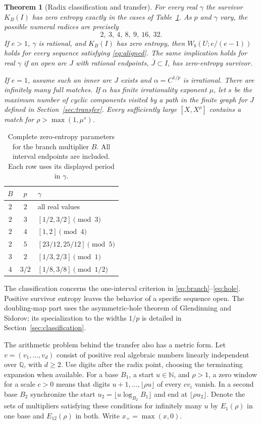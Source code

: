\documentclass[11pt,reqno,a4paper]{amsart}
\newtheorem{theorem}{Theorem}[section]
\theoremstyle{remark}
\begin{document}
\begin{theorem}[Radix classification and transfer]\label{thm:transfer}
For every real \(\gamma\) the survivor \(K_B(I)\) has zero entropy
exactly in the cases of Table~\ref{tab:zones}. As \(p\) and \(\gamma\)
vary, the possible numeral radices are precisely
\[
                  2,\ 3,\ 4,\ 8,\ 9,\ 16,\ 32 .
\]
If \(e>1\), \(\gamma\) is rational, and \(K_B(I)\) has zero entropy,
then \(W_b(U;e/(e-1))\) holds for every sequence satisfying
\eqref{eq:aligned}. The same implication holds for real \(\gamma\)
if an open arc \(J\) with rational endpoints, \(\overline J\subset I\),
has zero-entropy survivor.

If \(e=1\), assume such an inner arc \(J\) exists and
\(\alpha=C^{1/p}\) is irrational. There are infinitely many full
matches. If \(\alpha\) has finite irrationality exponent \(\mu\), let
\(s\) be the maximum number of cyclic components visited by a path in
the finite graph for \(J\) defined in Section~\ref{sec:transfer}.
Every sufficiently large \([X,X^\rho]\) contains a match for
\(\rho>\max(1,\mu^s)\).
\end{theorem}

\begin{table}[ht]
\centering
\caption{Complete zero-entropy parameters for the branch multiplier \(B\).
All interval endpoints are included. Each row uses its displayed period
in \(\gamma\).}\label{tab:zones}
\begin{tabular}{ccl}
\toprule
\(B\)& \(p\)& \(\gamma\)\\
\midrule
\(2\)&\(2\)& all real values\\
\(2\)&\(3\)& \([1/2,3/2]\pmod 3\)\\
\(2\)&\(4\)& \([1,2]\pmod 4\)\\
\(2\)&\(5\)& \([23/12,25/12]\pmod 5\)\\
\(3\)&\(2\)& \([1/3,2/3]\pmod 1\)\\
\(4\)&\(3/2\)& \([1/8,3/8]\pmod{1/2}\)\\
\bottomrule
\end{tabular}
\end{table}

The classification concerns the one-interval criterion in
\eqref{eq:branch}--\eqref{eq:hole}. Positive survivor entropy leaves
the behavior of a specific sequence open. The doubling-map part uses the
asymmetric-hole theorem of Glendinning and Sidorov; its specialization
to the widths \(1/p\) is detailed in Section~\ref{sec:classification}.

The arithmetic problem behind the transfer also has a metric form.
Let \(v=(v_1,\ldots,v_d)\) consist of positive real algebraic numbers
linearly independent over \(\mathbb Q\), with \(d\ge2\). Use digits after
the radix point, choosing the terminating expansion when available.
For a base \(B_1\), a start \(u\in\mathbb N\), and \(\rho>1\), a zero
window for a scale \(c>0\) means that digits \(u+1,\ldots,\lfloor\rho u\rfloor\)
of every \(cv_i\) vanish. In a second base \(B_2\) synchronize the
start \(u_2=\lfloor u\log_{B_2}B_1\rfloor\) and end at
\(\lfloor\rho u_2\rfloor\). Denote the sets of multipliers satisfying
these conditions for infinitely many \(u\) by \(E_1(\rho)\) in one
base and \(E_{12}(\rho)\) in both. Write \(x_+=\max(x,0)\).
\end{document}
